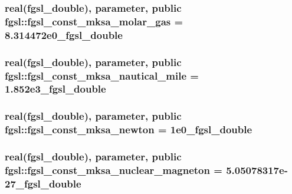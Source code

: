 \hypertarget{classfgsl_aba418557adafd1575eab5108ba172cf7}{
\subsubsection[{fgsl\-\_\-const\-\_\-mksa\-\_\-molar\-\_\-gas}]{\setlength{\rightskip}{0pt plus 5cm}real({\bf fgsl\-\_\-double}), parameter, public fgsl\-::fgsl\-\_\-const\-\_\-mksa\-\_\-molar\-\_\-gas = 8.\-314472e0\-\_\-fgsl\-\_\-double}}\label{classfgsl_aba418557adafd1575eab5108ba172cf7}
\hypertarget{classfgsl_a035a322332ff494af9c3ecfb5dca6125}{
\subsubsection[{fgsl\-\_\-const\-\_\-mksa\-\_\-nautical\-\_\-mile}]{\setlength{\rightskip}{0pt plus 5cm}real({\bf fgsl\-\_\-double}), parameter, public fgsl\-::fgsl\-\_\-const\-\_\-mksa\-\_\-nautical\-\_\-mile = 1.\-852e3\-\_\-fgsl\-\_\-double}}\label{classfgsl_a035a322332ff494af9c3ecfb5dca6125}
\hypertarget{classfgsl_a502e10d884393483a5f705039802ef9f}{
\subsubsection[{fgsl\-\_\-const\-\_\-mksa\-\_\-newton}]{\setlength{\rightskip}{0pt plus 5cm}real({\bf fgsl\-\_\-double}), parameter, public fgsl\-::fgsl\-\_\-const\-\_\-mksa\-\_\-newton = 1e0\-\_\-fgsl\-\_\-double}}\label{classfgsl_a502e10d884393483a5f705039802ef9f}
\hypertarget{classfgsl_a01a0e11a78d0097f8c8a170dbea03e3f}{
\subsubsection[{fgsl\-\_\-const\-\_\-mksa\-\_\-nuclear\-\_\-magneton}]{\setlength{\rightskip}{0pt plus 5cm}real({\bf fgsl\-\_\-double}), parameter, public fgsl\-::fgsl\-\_\-const\-\_\-mksa\-\_\-nuclear\-\_\-magneton = 5.\-05078317e-\/27\-\_\-fgsl\-\_\-double}}\label{classfgsl_a01a0e11a78d0097f8c8a170dbea03e3f}
